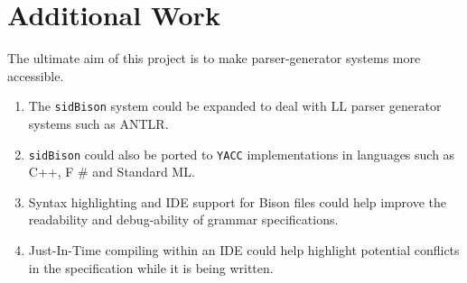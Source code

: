 \chapter{Additional Work}

The ultimate aim of this project is to make parser-generator systems more accessible. 
\begin{enumerate}
\item The \verb|sidBison| system could be expanded to deal with LL parser generator systems such as ANTLR. 
\item \verb|sidBison| could also be ported to \verb|YACC| implementations in languages such as C++, F \# and Standard ML.
\item Syntax highlighting and IDE support for Bison files could help improve the readability and debug-ability of grammar specifications.
\item Just-In-Time compiling within an IDE could help highlight potential conflicts in the specification while it is being written.

\end{enumerate}